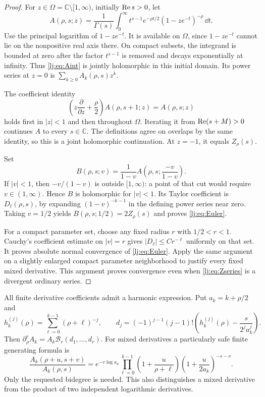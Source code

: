 \begin{proof}
For $z\in\Omega=\mathbb C\setminus[1,\infty)$, initially $\operatorname{Re} s>0$,
let
\begin{equation}
 A(\rho,s;z)=\frac1{\Gamma(s)}\int_0^\infty
        t^{s-1}e^{-\rho t/2}(1-ze^{-t})^{-\rho}\,\dd t.
 \label{lj:eq:Aint}
\end{equation}
Use the principal logarithm of $1-ze^{-t}$. It is available on
$\Omega$, since $1-ze^{-t}$ cannot lie on the nonpositive real axis
there. On compact subsets, the integrand is bounded at zero after the
factor $t^{s-1}$ is removed and decays exponentially at infinity.
Thus \eqref{lj:eq:Aint} is jointly holomorphic in this initial domain.
Its power series at $z=0$ is $\sum_{k\geq0}A_k(\rho,s)z^k$.

The coefficient identity
\begin{equation}
 \left(z\frac\partial{\partial z}+\frac\rho2\right)
 A(\rho,s+1;z)=A(\rho,s;z)
 \label{lj:eq:Aladder}
\end{equation}
holds first in $|z|<1$ and then throughout $\Omega$. Iterating it from
$\operatorname{Re}(s+M)>0$ continues $A$ to every $s\in\mathbb C$. The definitions
agree on overlaps by the same identity, so this is a joint holomorphic
continuation. At $z=-1$, it equals $Z_\rho(s)$.

Set
\[
 B(\rho,s;v)=\frac1{1-v}
              A\left(\rho,s;\frac{-v}{1-v}\right).
\]
If $|v|<1$, then $-v/(1-v)$ is outside $[1,\infty)$: a point of that
cut would require $v\in(1,\infty)$. Hence $B$ is holomorphic for
$|v|<1$. Its Taylor coefficient is $D_\ell(\rho,s)$, by expanding
$(1-v)^{-k-1}$ in the defining power series near zero.
Taking $v=1/2$ yields $B(\rho,s;1/2)=2Z_\rho(s)$ and proves
\eqref{lj:eq:Euler}.

For a compact parameter set, choose any fixed radius $r$ with
$1/2<r<1$. Cauchy's coefficient estimate on $|v|=r$ gives
$|D_\ell|\leq C r^{-\ell}$ uniformly on that set. It proves absolute
normal convergence of \eqref{lj:eq:Euler}. Apply the same argument on
a slightly enlarged compact parameter neighborhood to justify every
fixed mixed derivative. This argument proves convergence even when
\eqref{lj:eq:Zseries} is a divergent ordinary series.
\end{proof}

All finite derivative coefficients admit a harmonic expression. Put
$a_k=k+\rho/2$ and
\[
 h_k^{(j)}(\rho)=\sum_{\ell=0}^{k-1}(\rho+\ell)^{-j},\qquad
 d_j=(-1)^{j-1}(j-1)!
       \left(h_k^{(j)}(\rho)-\frac{s}{2^ja_k^j}\right).
\]
Then $\partial_\rho^r A_k=A_k\mathcal B_r(d_1,\ldots,d_r)$.
For mixed derivatives a particularly safe finite generating formula is
\begin{equation}
 \frac{A_k(\rho+u,s+v)}{A_k(\rho,s)}
 =e^{-v\log a_k}
       \prod_{\ell=0}^{k-1}\left(1+\frac{u}{\rho+\ell}\right)
       \left(1+\frac{u}{2a_k}\right)^{-s-v}.
 \label{lj:eq:mixedcoeff}
\end{equation}
Only the requested bidegree is needed. This also distinguishes a mixed
derivative from the product of two independent logarithmic derivatives.

